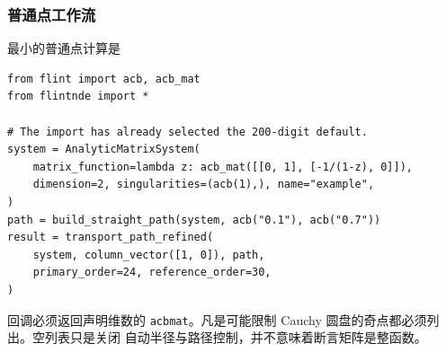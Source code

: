 \documentclass[11pt,a4paper]{ctexart}
\renewcommand{\_}{\origunderscore\allowbreak}
\begin{document}
\subsubsection{普通点工作流}
\label{subsec:transport-api}

最小的普通点计算是
\begin{verbatim}
from flint import acb, acb_mat
from flintnde import *

# The import has already selected the 200-digit default.
system = AnalyticMatrixSystem(
    matrix_function=lambda z: acb_mat([[0, 1], [-1/(1-z), 0]]),
    dimension=2, singularities=(acb(1),), name="example",
)
path = build_straight_path(system, acb("0.1"), acb("0.7"))
result = transport_path_refined(
    system, column_vector([1, 0]), path,
    primary_order=24, reference_order=30,
)
\end{verbatim}
回调必须返回声明维数的 \texttt{acb\_mat}。凡是可能限制 Cauchy 圆盘的奇点都必须列出。空列表只是关闭
自动半径与路径控制，并不意味着断言矩阵是整函数。
\end{document}
